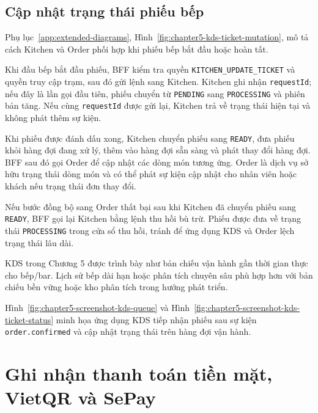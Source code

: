 \subsection{Cập nhật trạng thái phiếu bếp}

Phụ lục~\ref{app:extended-diagrams}, Hình~\ref{fig:chapter5-kds-ticket-mutation}, mô tả cách Kitchen và Order phối hợp khi phiếu bếp bắt đầu hoặc hoàn tất.

Khi đầu bếp bắt đầu phiếu, BFF kiểm tra quyền \texttt{KITCHEN\_UPDATE\_TICKET} và quyền truy cập trạm, sau đó gửi lệnh sang Kitchen. Kitchen ghi nhận \texttt{requestId}; nếu đây là lần gọi đầu tiên, phiếu chuyển từ \texttt{PENDING} sang \texttt{PROCESSING} và phiên bản tăng. Nếu cùng \texttt{requestId} được gửi lại, Kitchen trả về trạng thái hiện tại và không phát thêm sự kiện.

Khi phiếu được đánh dấu xong, Kitchen chuyển phiếu sang \texttt{READY}, đưa phiếu khỏi hàng đợi đang xử lý, thêm vào hàng đợi sẵn sàng và phát thay đổi hàng đợi. BFF sau đó gọi Order để cập nhật các dòng món tương ứng. Order là dịch vụ sở hữu trạng thái dòng món và có thể phát sự kiện cập nhật cho nhân viên hoặc khách nếu trạng thái đơn thay đổi.

Nếu bước đồng bộ sang Order thất bại sau khi Kitchen đã chuyển phiếu sang \texttt{READY}, BFF gọi lại Kitchen bằng lệnh thu hồi bù trừ. Phiếu được đưa về trạng thái \texttt{PROCESSING} trong cửa sổ thu hồi, tránh để ứng dụng KDS và Order lệch trạng thái lâu dài.

KDS trong Chương 5 được trình bày như bản chiếu vận hành gần thời gian thực cho bếp/bar. Lịch sử bếp dài hạn hoặc phân tích chuyên sâu phù hợp hơn với bản chiếu bền vững hoặc kho phân tích trong hướng phát triển.

Hình~\ref{fig:chapter5-screenshot-kds-queue} và Hình~\ref{fig:chapter5-screenshot-kds-ticket-status} minh họa ứng dụng KDS tiếp nhận phiếu sau sự kiện \texttt{order.confirmed} và cập nhật trạng thái trên hàng đợi vận hành.


\section{Ghi nhận thanh toán tiền mặt, VietQR và SePay}


